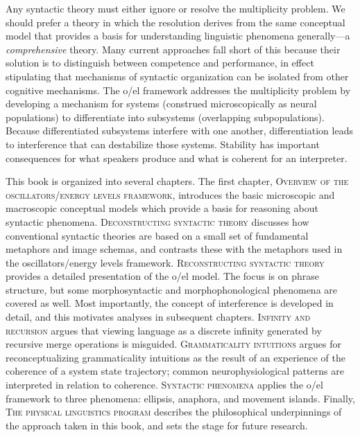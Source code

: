   Any syntactic theory must either ignore or resolve the multiplicity problem. We should prefer a theory in which the resolution derives from the same conceptual model that provides a basis for understanding linguistic phenomena generally—a \textit{comprehensive} theory. Many current approaches fall short of this because their solution is to distinguish between competence and performance, in effect stipulating that mechanisms of syntactic organization can be isolated from other cognitive mechanisms. The o/el framework addresses the multiplicity problem by developing a mechanism for systems (construed microscopically as neural populations) to differentiate into subsystems (overlapping subpopulations). Because differentiated subsystems interfere with one another, differentiation leads to interference that can destabilize those systems. Stability has important consequences for what speakers produce and what is coherent for an interpreter.

  This book is organized into several chapters. The first chapter, \textsc{Overview of the oscillators/energy levels framework}, introduces the basic microscopic and macroscopic conceptual models which provide a basis for reasoning about syntactic phenomena. \textsc{Deconstructing syntactic theory} discusses how conventional syntactic theories are based on a small set of fundamental metaphors and image schemas, and contrasts these with the metaphors used in the oscillators/energy levels framework. \textsc{Reconstructing syntactic theory} provides a detailed presentation of the o/el model. The focus is on phrase structure, but some morphosyntactic and morphophonological phenomena are covered as well. Most importantly, the concept of interference is developed in detail, and this motivates analyses in subsequent chapters. \textsc{Infinity and recursion} argues that viewing language as a discrete infinity generated by recursive merge operations is misguided. \textsc{Grammaticality intuitions} argues for reconceptualizing grammaticality intuitions as the result of an experience of the coherence of a system state trajectory; common neurophysiological patterns are interpreted in relation to coherence. \textsc{Syntactic phenomena} applies the o/el framework to three phenomena: ellipsis, anaphora, and movement islands. Finally, \textsc{The physical linguistics program} describes the philosophical underpinnings of the approach taken in this book, and sets the stage for future research.


